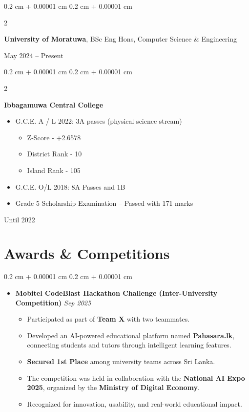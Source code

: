 \documentclass[10pt, letterpaper]{article}
\newenvironment{highlights}{
	\begin{itemize}[
		topsep=0.10 cm,
		parsep=0.10 cm,
		partopsep=0pt,
		itemsep=0pt,
		leftmargin=0.4 cm + 10pt
		]
	}{
	\end{itemize}
} %
\newenvironment{highlightsforbulletentries}{
	\begin{itemize}[
		topsep=0.10 cm,
		parsep=0.10 cm,
		partopsep=0pt,
		itemsep=0pt,
		leftmargin=10pt
		]
	}{
	\end{itemize}
} %
\newenvironment{onecolentry}{
	\begin{adjustwidth}{
			0.2 cm + 0.00001 cm
		}{
			0.2 cm + 0.00001 cm
		}
	}{
	\end{adjustwidth}
} %
\newenvironment{twocolentry}[2][]{
	\onecolentry
	\def\secondColumn{#2}
	\setcolumnwidth{\fill, 4.5 cm}
	\begin{paracol}{2}
	}{
		\switchcolumn \raggedleft \secondColumn
	\end{paracol}
	\endonecolentry
} %
\begin{document}
	
	
	
	\begin{twocolentry}{
			May 2024 – Present
		}
		\textbf{University of Moratuwa}, BSc Eng Hons, Computer Science \& Engineering
		
		
		
	\end{twocolentry}
	
	
	
	\vspace{0.2 cm}
	\begin{twocolentry}{
			Until 2022
		}
		\textbf{Ibbagamuwa Central College }
		
		\begin{highlights}
			
			\item G.C.E. A / L 2022: 3A passes (physical science stream)  \begin{itemize}
				\item Z-Score - +2.6578
				\item District Rank - 10
				\item Island Rank - 105
			\end{itemize}
			
			\item G.C.E. O/L 2018: 8A Passes and 1B
			\item Grade 5 Scholarship Examination – Passed with 171 marks
		\end{highlights} 
	\end{twocolentry}
	
	
\section{Awards \& Competitions}

\begin{onecolentry}
	
	\begin{highlightsforbulletentries}
		
		\item \textbf{Mobitel CodeBlast Hackathon Challenge (Inter-University Competition)} \hfill \textit{Sep 2025}
		\begin{itemize}
			\item Participated as part of \textbf{Team X} with two teammates.
			\item Developed an AI-powered educational platform named \textbf{Pahasara.lk}, connecting students and tutors through intelligent learning features.
			\item \textbf{Secured 1st Place} among university teams across Sri Lanka.
			\item The competition was held in collaboration with the \textbf{National AI Expo 2025}, organized by the \textbf{Ministry of Digital Economy}.
			\item Recognized for innovation, usability, and real-world educational impact.
		\end{itemize}
		
	\end{highlightsforbulletentries}
	
\end{onecolentry}
\end{document}
